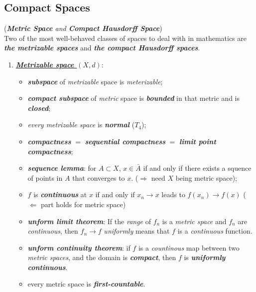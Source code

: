 \documentclass[11pt]{article}
\begin{document}
\subsection{Compact Spaces}
\begin{remark} (\emph{\textbf{Metric Space} and \textbf{Compact Hausdorff Space}})\\
Two of the most well-behaved classes of spaces to deal with in mathematics are \emph{\textbf{the metrizable spaces}} and \emph{\textbf{the compact Hausdorff spaces}}. 
\begin{enumerate}
\item \underline{\emph{\textbf{Metrizable space $(X ,d)$}}}: 
\begin{itemize}
\item \emph{\textbf{subspace}} of \emph{metrizable} space is \emph{meterizable};
\item \emph{\textbf{compact subspace}} of \emph{metric} space is \emph{\textbf{bounded}} in that metric and is \emph{\textbf{closed}};
\item \emph{every metrizable space} is \emph{\textbf{normal}} ($T_4$);
\item \emph{\textbf{compactness}} $=$ \emph{\textbf{sequential compactness}} $=$ \emph{\textbf{limit point compactness}};
\item \emph{\textbf{sequence lemma}}: for $A \subset X$,  $x \in \bar{A}$ if and only if  there exists a squence of points in $A$ that converges to $x$.  ($\Rightarrow$ need $X$ being metric space);
\item $f$ is \emph{\textbf{continuous}} at $x$ if and only if $x_n \rightarrow x$ leads to $f(x_n) \rightarrow f(x)$ ($\Leftarrow$ part holds for metric space)
\item \emph{\textbf{unform limit theorem}}: If the \emph{range} of $f_n$ is a \emph{metric space} and $f_n$ are \emph{continuous}, then $f_n \rightarrow f$ \emph{uniformly} means that $f$ is a \emph{continuous} function. 
\item \emph{\textbf{unform continuity theorem}}: if $f$ is a \emph{countinous} map between two \emph{metric spaces}, and the domain is \emph{\textbf{compact}}, then $f$ is \emph{\textbf{uniformly continuous}}.
\item every metric space is \emph{\textbf{first-countable}}.
\end{itemize}


\end{enumerate}
\end{remark}
\end{document}
